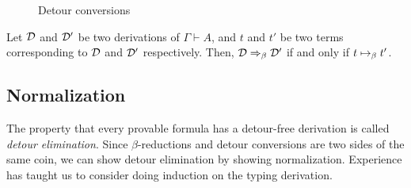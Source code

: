 \documentclass[a4paper]{article}
\begin{document}
\begin{figure}
  \centering
  \caption{Detour conversions}
  \label{0002}
\end{figure}

\begin{theorem}
  Let $\mathcal{D}$ and $\mathcal{D}'$ be two derivations of $\Gamma \vdash A$, and $t$ and $t'$ be two terms corresponding to $\mathcal{D}$ and $\mathcal{D}'$ respectively.
  Then, $\mathcal{D} \Rightarrow_{\beta} \mathcal{D}'$ if and only if $t \bRed t'$.
\end{theorem}

\subsection{Normalization}
\label{sec:0004}

The property that every provable formula has a detour-free derivation is called \emph{detour elimination}.
Since $\beta$-reductions and detour conversions are two sides of the same coin, we can show detour elimination by showing normalization.
Experience has taught us to consider doing induction on the typing derivation.
\end{document}

